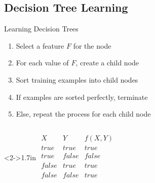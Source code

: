 \documentclass[14pt]{beamer}
\begin{document}
\subsection{Decision Tree Learning}

\begin{frame}{Learning Decision Trees}
\begin{enumerate}
\item Select a feature $F$ for the node
\item For each value of $F$, create a child node
\item Sort training examples into child nodes
\item If examples are sorted perfectly, terminate
\item Else, repeat the process for each child node
\end{enumerate}
\begin{columns}
\begin{column}<2->{1.7in}
$
\begin{array}{cc|c}
X          &  Y          & f(X, Y) \\
\hline
\textit{true}  & \textit{true}   & \textit{true} \\
\textit{true}  & \textit{false}  & \textit{false} \\
\textit{false} & \textit{true}   & \textit{true} \\
\textit{false} & \textit{false}  & \textit{true} \\
\end{array}
$
\end{column}
\begin{column}{2.6in}
%

\end{column}
\end{columns}
\end{frame}
\end{document}
